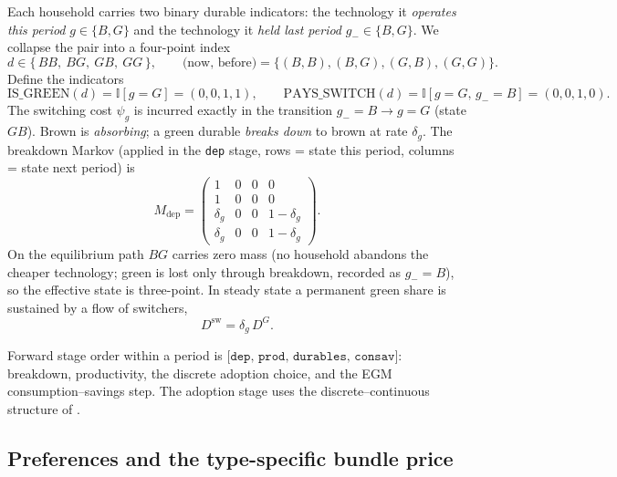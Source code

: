 \documentclass[11pt]{article}
\newcommand{\I}{\mathbb{I}}
\newcommand{\dsw}{D^{\mathrm{sw}}}
\newcommand{\DG}{D^{G}}
\begin{document}
Each household carries two binary durable indicators: the technology it
\emph{operates this period} $g\in\{B,G\}$ and the technology it \emph{held last
period} $g_-\in\{B,G\}$. We collapse the pair into a four-point index
\begin{equation}
d\in\{\,BB,\ BG,\ GB,\ GG\,\},\qquad
\text{(now, before)}=\{(B,B),(B,G),(G,B),(G,G)\}.
\end{equation}
Define the indicators
\begin{equation}
\mathrm{IS\_GREEN}(d)=\I[g=G]=(0,0,1,1),\qquad
\mathrm{PAYS\_SWITCH}(d)=\I[g=G,\,g_-=B]=(0,0,1,0).
\end{equation}
The switching cost $\psi_g$ is incurred exactly in the transition $g_-=B\to g=G$
(state $GB$). Brown is \emph{absorbing}; a green durable \emph{breaks down} to
brown at rate $\delta_g$. The breakdown Markov (applied in the \texttt{dep}
stage, rows = state this period, columns = state next period) is
\begin{equation}
M_{\mathrm{dep}}=
\begin{pmatrix}
1 & 0 & 0 & 0\\
1 & 0 & 0 & 0\\
\delta_g & 0 & 0 & 1-\delta_g\\
\delta_g & 0 & 0 & 1-\delta_g
\end{pmatrix}.
\end{equation}
On the equilibrium path $BG$ carries zero mass (no household abandons the
cheaper technology; green is lost only through breakdown, recorded as $g_-=B$),
so the effective state is three-point. In steady state a permanent green share is
sustained by a flow of switchers,
\begin{equation}
\dsw=\delta_g\,\DG. \label{eq:stockflow}
\end{equation}

Forward stage order within a period is
$\texttt{[dep, prod, durables, consav]}$: breakdown, productivity, the discrete
adoption choice, and the EGM consumption--savings step. The adoption stage uses
the discrete--continuous structure of \cite{DCEGM2017}.

\subsection{Preferences and the type-specific bundle price}
\end{document}
